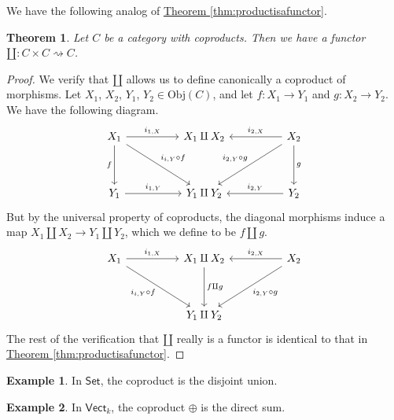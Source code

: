 \documentclass[a4paper,10pt]{scrreprt}
\newcommand{\Obj}{\mathrm{Obj}}
\theoremstyle{definition}
\newtheorem{example}{Example}[section]
\theoremstyle{plain}
\newtheorem{theorem}{Theorem}[section]
\theoremstyle{remark}
\begin{document}
We have the following analog of \hyperref[thm:productisafunctor]{Theorem \ref*{thm:productisafunctor}}.
\begin{theorem}
  \label{thm:coproductisafunctor}
  Let $C$ be a category with coproducts. Then we have a functor $\amalg\colon C \times C \rightsquigarrow C$.
\end{theorem}
\begin{proof}
  We verify that $\amalg$ allows us to define canonically a coproduct of morphisms. Let $X_{1}$, $X_{2}$, $Y_{1}$, $Y_{2} \in \Obj(C)$, and let $f\colon X_{1} \to Y_{1}$ and $g\colon X_{2} \to Y_{2}$. We have the following diagram.
  \begin{equation*}
    \begin{tikzcd}[row sep=huge, column sep=huge]
      X_{1} \arrow[d, swap, "f"] \arrow[dr, "{i_{i,Y} \circ f}"] \arrow[r, "{i_{1, X}}"]& X_{1} \amalg X_{2} & X_{2} \arrow[dl, swap, "{i_{2, Y} \circ g}"] \arrow[ d, "g"] \arrow[l, swap, "{i_{2, X}}"] \\
      Y_{1} \arrow[r, "{i_{1, Y}}"]& Y_{1} \amalg Y_{2} & Y_{2} \arrow[l, swap, "{i_{2, Y}}"]
    \end{tikzcd}
  \end{equation*}
  But by the universal property of coproducts, the diagonal morphisms induce a map $X_{1} \amalg X_{2} \to Y_{1} \amalg Y_{2}$, which we define to be $f \amalg g$.
  \begin{equation*}
    \begin{tikzcd}[row sep=huge, column sep=huge]
      X_{1} \arrow[dr, swap, "{i_{i,Y} \circ f}"] \arrow[r, "{i_{1, X}}"]& X_{1} \arrow[d, "f \amalg g"] \amalg X_{2} & X_{2} \arrow[dl, "{i_{2, Y} \circ g}"] \arrow[l, swap, "{i_{2, X}}"] \\
      & Y_{1} \amalg Y_{2} &
    \end{tikzcd}
  \end{equation*}
  The rest of the verification that $\amalg$ really is a functor is identical to that in \hyperref[thm:productisafunctor]{Theorem \ref*{thm:productisafunctor}}.
\end{proof}

\begin{example}
  In $\mathsf{Set}$, the coproduct is the disjoint union. 
\end{example}

\begin{example}
  In $\mathsf{Vect}_{k}$, the coproduct $\oplus$ is the direct sum.
\end{example}
\end{document}
